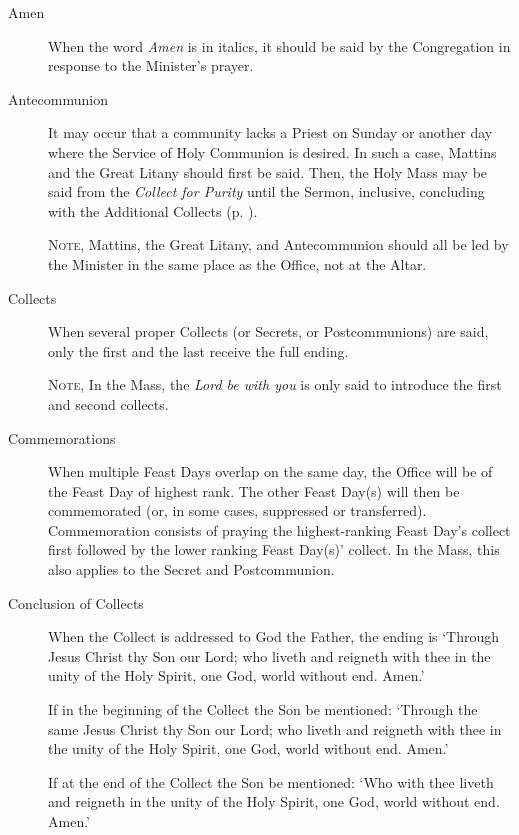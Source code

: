 \begin{description}
\item[Amen] When the word \emph{Amen} is in italics, it should be said by the Congregation in response to the Minister's prayer.
\item[Antecommunion] It may occur that a community lacks a Priest on Sunday or another day where the Service of Holy Communion is desired. In such a case, Mattins and the Great Litany should first be said. Then, the Holy Mass may be said from the \emph{Collect for Purity} until the Sermon, inclusive, concluding with the Additional Collects (p. \pageref{AdditionalCollects}).\par
\textsc{Note,} Mattins, the Great Litany, and Antecommunion should all be led by the Minister in the same place as the Office, not at the Altar.
\item[Collects] When several proper Collects (or Secrets, or Postcommunions) are said, only the first and the last receive the full ending.\par
	\textsc{Note,} In the Mass, the \emph{Lord be with you} is only said to introduce the first and second collects.
\item[Commemorations] When multiple Feast Days overlap on the same day, the Office will be of the Feast Day of highest rank. The other Feast Day(s) will then be commemorated (or, in some cases, suppressed or transferred). Commemoration consists of praying the highest-ranking Feast Day's collect first followed by the lower ranking Feast Day(s)' collect. In the Mass, this also applies to the Secret and Postcommunion.
\item[Conclusion of Collects] When the Collect is addressed to God the Father, the ending is `Through Jesus Christ thy Son our Lord; who liveth and reigneth with thee in the unity of the Holy Spirit, one God, world without end. Amen.'\par
If in the beginning of the Collect the Son be mentioned: `Through the same Jesus Christ thy Son our Lord; who liveth and reigneth with thee in the unity of the Holy Spirit, one God, world without end. Amen.'\par
If at the end of the Collect the Son be mentioned: `Who with thee liveth and reigneth in the unity of the Holy Spirit, one God, world without end. Amen.'\par

\end{description}
